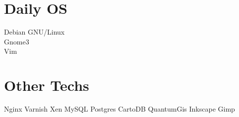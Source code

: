 \documentclass[]{friggeri-cv}
\begin{document}
\begin{aside}
  \section{Daily OS}
    Debian GNU/Linux\\%
    Gnome3\\%
    Vim
    ~
  \section{Other Techs}
    Nginx
    Varnish
    Xen
    MySQL
    Postgres
    CartoDB
    QuantumGis
    Inkscape
    Gimp
\end{aside}
\end{document}
